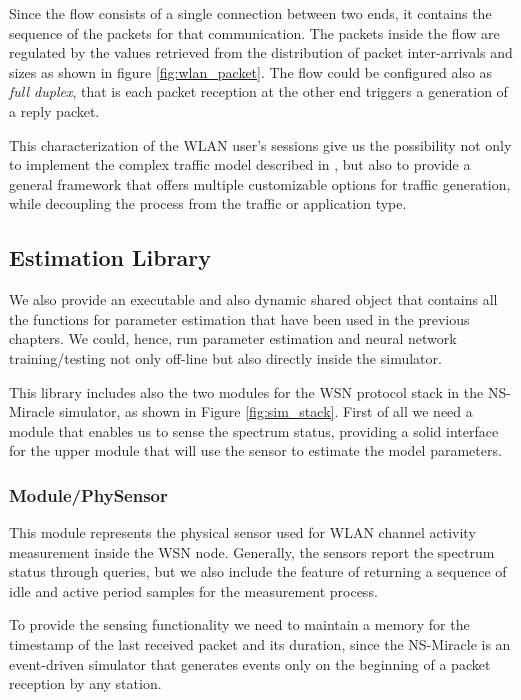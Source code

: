 Since the flow consists of a single connection between two ends, it contains the sequence of the packets for that communication. The packets inside the flow are regulated by the values retrieved from the distribution of packet inter-arrivals and sizes as shown in figure \ref{fig:wlan_packet}. The flow could be configured also as \textit{full duplex}, that is each packet reception at the other end triggers a generation of a reply packet.

This characterization of the \ac{WLAN} user's sessions give us the possibility not only to implement the complex traffic model described in \cite{Campus-WLAN}, but also to provide a general framework that offers multiple customizable options for traffic generation, while decoupling the process from the traffic or application type.

\subsection{Estimation Library} \label{sec:sim_estimation}

We also provide an executable and also dynamic shared object that contains all the functions for parameter estimation that have been used in the previous chapters. We could, hence, run parameter estimation and neural network training/testing not only off-line but also directly inside the simulator.

This library includes also the two modules for the \ac{WSN} protocol stack in the \acs{NS-Miracle} simulator, as shown in Figure \ref{fig:sim_stack}. First of all we need a module that enables us to sense the spectrum status, providing a solid interface for the upper module that will use the sensor to estimate the model parameters.

\subsubsection{Module/PhySensor}

This module represents the physical sensor used for \ac{WLAN} channel activity measurement inside the \ac{WSN} node. Generally, the sensors report the spectrum status through queries, but we also include the feature of returning a sequence of idle and active period samples for the measurement process.

To provide the sensing functionality we need to maintain a memory for the timestamp of the last received packet and its duration, since the \acs{NS-Miracle} is an event-driven simulator that generates events only on the beginning of a packet reception by any station.

